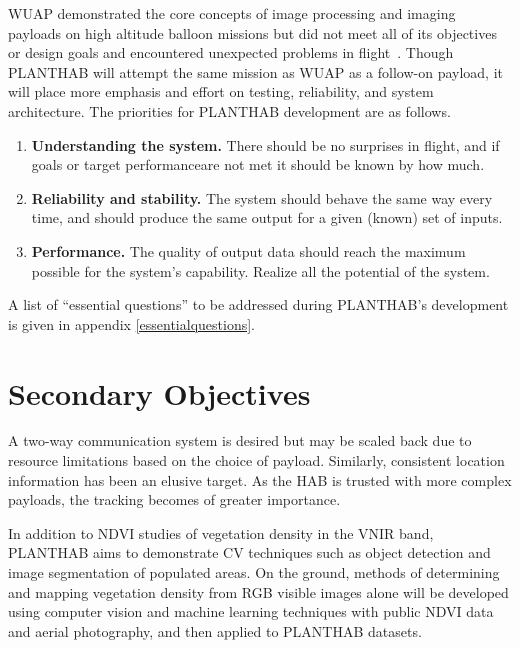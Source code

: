 \documentclass[conference]{IEEEtran} %
\begin{document}
WUAP demonstrated the core concepts of image processing and imaging payloads on high altitude balloon missions but did not meet all of its objectives or design goals and encountered unexpected problems in flight~\cite[Post-Flight Analysis]{wuaphab4}. 
Though PLANTHAB will attempt the same mission as WUAP as a follow-on payload, it will place more emphasis and effort on testing, reliability, and system architecture. 
The priorities for PLANTHAB development are as follows. 
\begin{enumerate}\small
    \item \textbf{Understanding the system.} There should be no surprises in flight, and if goals or target performanceare not met it should be known by how much.
    \item \textbf{Reliability and stability.} The system should behave the same way every time, and should produce the same output for a given (known) set of inputs.
    \item \textbf{Performance.} The quality of output data should reach the maximum possible for the system's capability. Realize all the potential of the system.
\end{enumerate}

A list of ``essential questions'' to be addressed during PLANTHAB's development is given in appendix \ref{essentialquestions}.


\section{Secondary Objectives}
\label{secondaryobjectives}
A two-way communication system is desired but may be scaled back due to resource limitations based on the choice of payload. 
Similarly, consistent location information has been an elusive target. 
As the HAB is trusted with more complex payloads, the tracking becomes of greater importance.
 
In addition to NDVI studies of vegetation density in the VNIR band, PLANTHAB aims to demonstrate CV techniques such as object detection and image segmentation of populated areas. 
On the ground, methods of determining and mapping vegetation density from RGB visible images alone will be developed using computer vision and machine learning techniques with public NDVI data and aerial photography, and then applied to PLANTHAB datasets. 
\end{document}
